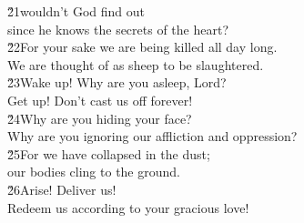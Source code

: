 \begin{poetry}
\poeml \v{21}wouldn't God find out \\
\poemll    since he knows the secrets of the heart? \\
\poeml \v{22}For your sake we are being killed all day long. \\
\poemll    We are thought of as sheep to be slaughtered. \\
\poeml \v{23}Wake up! Why are you asleep, Lord? \\
\poemll    Get up! Don't cast us off forever! \\
\poeml \v{24}Why are you hiding your face? \\
\poemll    Why are you ignoring our affliction and oppression? \\
\poeml \v{25}For we have collapsed in the dust; \\
\poemll    our bodies cling to the ground. \\
\poeml \v{26}Arise! Deliver us! \\
\poemll    Redeem us according to your gracious love!
\end{poetry}

